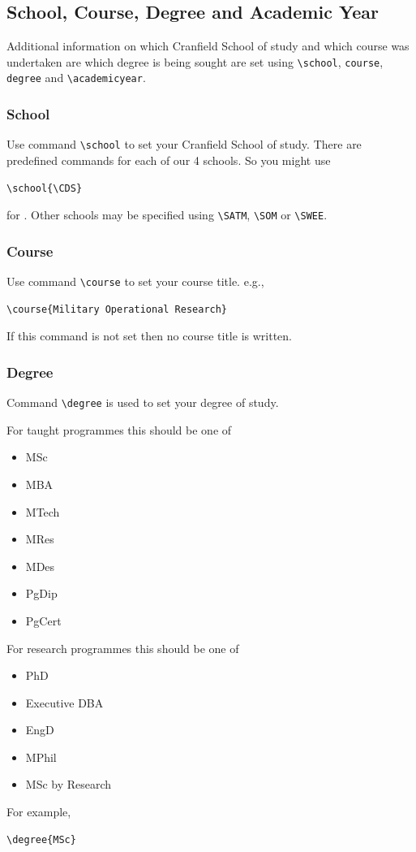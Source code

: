 \documentclass[12pt,oneside]{book} %
\begin{document}
\subsection{School, Course, Degree and Academic Year}
\label{sec:SchoolCourse}
Additional information on which Cranfield School of study and which course was undertaken are which degree is being sought are set using \verb#\school#, \verb#course#, \verb#degree# and \verb#\academicyear#.

\subsubsection{School}
\label{sec:School} 
Use command \verb#\school# to set your Cranfield School of study. There are predefined commands for each of our 4 schools. So you might use
\begin{verbatim}
\school{\CDS}
\end{verbatim}
for \CDS. Other schools may be specified using \verb#\SATM#, \verb#\SOM# or \verb#\SWEE#.

\subsubsection{Course}
\label{sec:Course}
Use command \verb#\course# to set your course title. e.g.,
\begin{verbatim}
\course{Military Operational Research}
\end{verbatim}
If this command is not set then no course title is written.

\subsubsection{Degree}
\label{sec:degree}
Command \verb#\degree# is used to set your degree of study. 

For taught programmes \cite{cranfield_university_taught_2023} this should be one of 
\begin{itemize}
\item MSc
\item MBA
\item MTech
\item MRes
\item MDes
\item PgDip
\item PgCert
\end{itemize}
For research programmes \cite{cranfield_university_research_2023} this should be one of 
\begin{itemize}
\item PhD
\item Executive DBA
\item EngD
\item MPhil
\item MSc by Research
\end{itemize}
For example,
\begin{verbatim}
\degree{MSc}
\end{verbatim}
\end{document}
